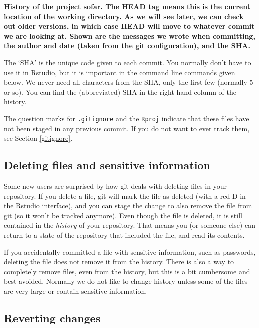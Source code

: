\documentclass[]{book}
\begin{document}
\textbf{History of the project sofar. The HEAD tag means this is the current location of the working directory. As we will see later, we can check out older versions, in which case HEAD will move to whatever commit we are looking at. Shown are the messages we wrote when committing, the author and date (taken from the git configuration), and the SHA.}

The `SHA' is the unique code given to each commit. You normally don't have to use it in Rstudio, but it is important in the command line commands given below. We never need all characters from the SHA, only the first few (normally 5 or so). You can find the (abbreviated) SHA in the right-hand column of the history.

The question marks for \texttt{.gitignore} and the \texttt{Rproj} indicate that these files have not been staged in any previous commit. If you do not want to ever track them, see Section \ref{gitignore}.

\hypertarget{deleting-files-and-sensitive-information}{%
\subsection{Deleting files and sensitive information}\label{deleting-files-and-sensitive-information}}

Some new users are surprised by how git deals with deleting files in your repository. If you delete a file, git will mark the file as deleted (with a red D in the Rstudio interface), and you can stage the change to also remove the file from git (so it won't be tracked anymore). Even though the file is deleted, it is still contained in the \emph{history} of your repository. That means you (or someone else) can return to a state of the repository that included the file, and read its contents.

If you accidentally committed a file with sensitive information, such as passwords, deleting the file does not remove it from the history. There is also a way to completely remove files, even from the history, but this is a bit cumbersome and best avoided. Normally we do not like to change history unless some of the files are very large or contain sensitive information.

\hypertarget{reverting-changes}{%
\subsection{Reverting changes}\label{reverting-changes}}
\end{document}
